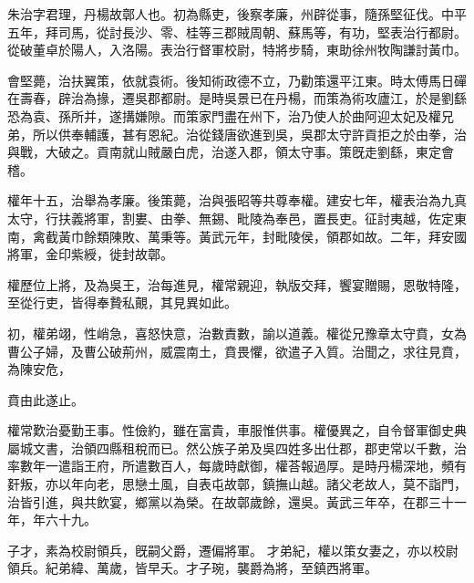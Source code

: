 \begin{pinyinscope}
 
 
 朱治字君理，丹楊故鄣人也。初為縣吏，後察孝廉，州辟從事，隨孫堅征伐。中平五年，拜司馬，從討長沙、零、桂等三郡賊周朝、蘇馬等，有功，堅表治行都尉。從破董卓於陽人，入洛陽。表治行督軍校尉，特將步騎，東助徐州牧陶謙討黃巾。
 
 
 
 
 會堅薨，治扶翼策，依就袁術。後知術政德不立，乃勸策還平江東。時太傅馬日磾在壽春，辟治為掾，遷吳郡都尉。是時吳景已在丹楊，而策為術攻廬江，於是劉繇恐為袁、孫所并，遂搆嫌隙。而策家門盡在州下，治乃使人於曲阿迎太妃及權兄弟，所以供奉輔護，甚有恩紀。治從錢唐欲進到吳，吳郡太守許貢拒之於由拳，治與戰，大破之。貢南就山賊嚴白虎，治遂入郡，領太守事。策旣走劉繇，東定會稽。
 
 
 
 
 權年十五，治舉為孝廉。後策薨，治與張昭等共尊奉權。建安七年，權表治為九真太守，行扶義將軍，割婁、由拳、無錫、毗陵為奉邑，置長吏。征討夷越，佐定東南，禽截黃巾餘類陳敗、萬秉等。黃武元年，封毗陵侯，領郡如故。二年，拜安國將軍，金印紫綬，徙封故鄣。
 
 
 
 
 權歷位上將，及為吳王，治每進見，權常親迎，執版交拜，饗宴贈賜，恩敬特隆，至從行吏，皆得奉贄私覿，其見異如此。
 
 
 
 
 初，權弟翊，性峭急，喜怒快意，治數責數，諭以道義。權從兄豫章太守賁，女為曹公子婦，及曹公破荊州，威震南土，賁畏懼，欲遣子入質。治聞之，求往見賁，為陳安危，
 
 
 賁由此遂止。
 
 
 
 
 權常歎治憂勤王事。性儉約，雖在富貴，車服惟供事。權優異之，自令督軍御史典屬城文書，治領四縣租稅而已。然公族子弟及吳四姓多出仕郡，郡吏常以千數，治率數年一遣詣王府，所遣數百人，每歲時獻御，權荅報過厚。是時丹楊深地，頻有姧叛，亦以年向老，思戀土風，自表屯故鄣，鎮撫山越。諸父老故人，莫不詣門，治皆引進，與共飲宴，鄉黨以為榮。在故鄣歲餘，還吳。黃武三年卒，在郡三十一年，年六十九。
 
 
子才，素為校尉領兵，旣嗣父爵，遷偏將軍。
 才弟紀，權以策女妻之，亦以校尉領兵。紀弟緯、萬歲，皆早夭。才子琬，襲爵為將，至鎮西將軍。
 
 
\end{pinyinscope}
